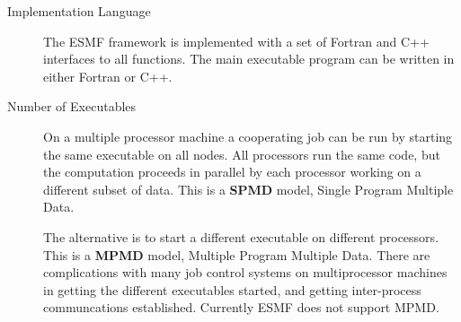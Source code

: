 \begin{description}
\item[Implementation Language]

The ESMF framework is implemented with a set of Fortran and C++ interfaces
to all functions.  The main executable program can be written in either
Fortran or C++.

\item[Number of Executables]

On a multiple processor machine a cooperating job can be run 
by starting the same executable on all nodes.  All processors run the
same code, but the computation proceeds in parallel by each processor 
working on a different subset of data.  This is a {\bf SPMD} model, 
Single Program Multiple Data.  

The alternative is to start a different executable on different
processors.  This is a {\bf MPMD} model, Multiple Program Multiple Data.
There are complications with many job control systems on multiprocessor
machines in getting the different executables started, and getting
inter-process communcations established.  Currently ESMF does not
support MPMD.

\end{description}




